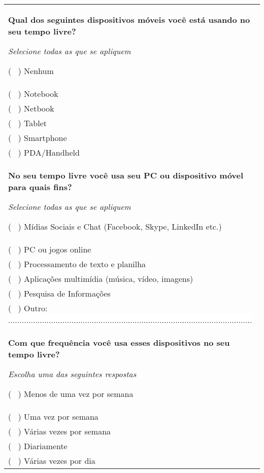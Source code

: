 \begin{longtable}{|p{15.7cm}|}
	\begin{Spacing}{0.8} \end{Spacing}
	\begin{Spacing}{0.8} 
		\textbf{Qual dos seguintes dispositivos móveis você está usando no seu tempo livre?} \end{Spacing} 
	\begin{Spacing}{2.0} 
		\tiny \textit{Selecione todas as que se apliquem} \end{Spacing}
	( \ ) Nenhum \\
	( \ ) Notebook \\
	( \ ) Netbook \\
	( \ ) Tablet \\
	( \ ) Smartphone \\
	( \ ) PDA/Handheld \\
	\begin{Spacing}{0.8} \end{Spacing}
	\begin{Spacing}{0.8} 
		\textbf{No seu tempo livre você usa seu PC ou dispositivo móvel para quais fins?} \end{Spacing} 
	\begin{Spacing}{2.0} 
		\tiny \textit{Selecione todas as que se apliquem} \end{Spacing} 
	( \ ) Mídias Sociais e Chat (Facebook, Skype, LinkedIn etc.) \\
	( \ ) PC ou jogos online \\
	( \ ) Processamento de texto e planilha \\
	( \ ) Aplicações multimídia (música, vídeo, imagens) \\
	( \ ) Pesquisa de Informações \\
	( \ ) Outro: \colorbox{white}{ ............................................................................................................ } \\
	\begin{Spacing}{0.8} \end{Spacing}
	\begin{Spacing}{0.8} 
		\textbf{Com que frequência você usa esses dispositivos no seu tempo livre?}
	\end{Spacing} 
	\begin{Spacing}{2.0} 
		\tiny \textit{Escolha uma das seguintes respostas} \end{Spacing}
	( \ ) Menos de uma vez por semana \\
	( \ ) Uma vez por semana \\
	( \ ) Várias vezes por semana \\
	( \ ) Diariamente \\
	( \ ) Várias vezes por dia \\
	\hline
\end{longtable}

